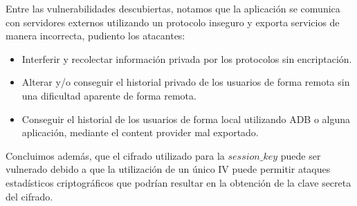 \documentclass[10pt, a4paper]{article}
\begin{document}
Entre las vulnerabilidades descubiertas, notamos que la aplicación se comunica con servidores externos utilizando un protocolo inseguro y exporta servicios de manera incorrecta, pudiento los atacantes:
\begin{itemize}
\item Interferir y recolectar información privada por los protocolos sin encriptación.
\item Alterar y/o conseguir el historial privado de los usuarios de forma remota sin una dificultad aparente de forma remota.
\item Conseguir el historial de los usuarios de forma local utilizando ADB o alguna aplicación, mediante el content provider mal exportado.
\end{itemize}

Concluimos además, que el cifrado utilizado para la $session\_key$ puede ser vulnerado debido a que la utilización de un único IV puede permitir ataques estadísticos criptográficos que podrían resultar en la obtención de la clave secreta del cifrado.
\end{document}
